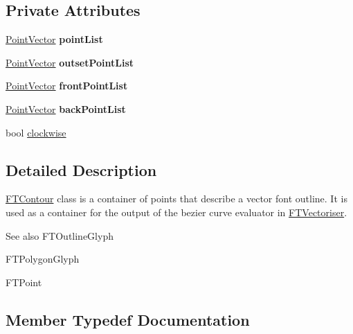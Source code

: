 \subsection*{Private Attributes}
\begin{DoxyCompactItemize}
\item 
\hyperlink{class_f_t_contour_a170439e09f11c88af80c13b772b77f84}{Point\+Vector} {\bfseries point\+List}\hypertarget{class_f_t_contour_a0ad61ac9f17355472f12fe14b1325d41}{}\label{class_f_t_contour_a0ad61ac9f17355472f12fe14b1325d41}

\item 
\hyperlink{class_f_t_contour_a170439e09f11c88af80c13b772b77f84}{Point\+Vector} {\bfseries outset\+Point\+List}\hypertarget{class_f_t_contour_acb50773e4091b0d8a36c94163cb49840}{}\label{class_f_t_contour_acb50773e4091b0d8a36c94163cb49840}

\item 
\hyperlink{class_f_t_contour_a170439e09f11c88af80c13b772b77f84}{Point\+Vector} {\bfseries front\+Point\+List}\hypertarget{class_f_t_contour_a431707d1e046f3f30edde1287e77d556}{}\label{class_f_t_contour_a431707d1e046f3f30edde1287e77d556}

\item 
\hyperlink{class_f_t_contour_a170439e09f11c88af80c13b772b77f84}{Point\+Vector} {\bfseries back\+Point\+List}\hypertarget{class_f_t_contour_aab7c5b0faef2929e2c7f22c4514d56b4}{}\label{class_f_t_contour_aab7c5b0faef2929e2c7f22c4514d56b4}

\item 
bool \hyperlink{class_f_t_contour_a67428b983bf4c5d0c5101ec382c92bac}{clockwise}
\end{DoxyCompactItemize}


\subsection{Detailed Description}
\hyperlink{class_f_t_contour}{F\+T\+Contour} class is a container of points that describe a vector font outline. It is used as a container for the output of the bezier curve evaluator in \hyperlink{class_f_t_vectoriser}{F\+T\+Vectoriser}.

\begin{DoxySeeAlso}{See also}
F\+T\+Outline\+Glyph 

F\+T\+Polygon\+Glyph 

F\+T\+Point 
\end{DoxySeeAlso}


\subsection{Member Typedef Documentation}

